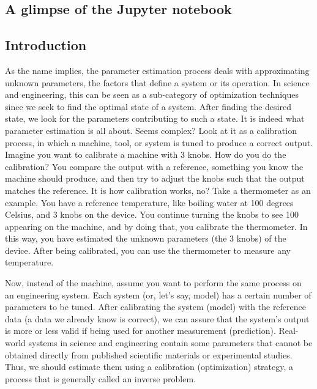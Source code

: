\begin{subappendices}

\section{A glimpse of the Jupyter notebook}

\subsection{Introduction}

As the name implies, the parameter estimation process deals with approximating unknown parameters, the factors that define a system or its operation. In science and engineering, this can be seen as a sub-category of optimization techniques since we seek to find the optimal state of a system. After finding the desired state, we look for the parameters contributing to such a state. It is indeed what parameter estimation is all about. Seems complex? Look at it as a calibration process, in which a machine, tool, or system is tuned to produce a correct output. Imagine you want to calibrate a machine with 3 knobs. How do you do the calibration?  You compare the output with a reference, something you know the machine should produce, and then try to adjust the knobs such that the output matches the reference. It is how calibration works, no? Take a thermometer as an example. You have a reference temperature, like boiling water at 100 degrees Celsius, and 3 knobs on the device. You continue turning the knobs to see 100 appearing on the machine, and by doing that, you calibrate the thermometer. In this way, you have estimated the unknown parameters (the 3 knobs) of the device. After being calibrated,  you can use the thermometer to measure any temperature.

Now, instead of the machine, assume you want to perform the same process on an engineering system. Each system (or, let's say, model) has a certain number of parameters to be tuned. After calibrating the system (model) with the reference data (a data we already know is correct), we can assure that the system's output is more or less valid if being used for another measurement (prediction). Real-world systems in science and engineering contain some parameters that cannot be obtained directly from published scientific materials or experimental studies. Thus, we should estimate them using a calibration (optimization) strategy, a process that is generally called an inverse problem.


\end{subappendices}
